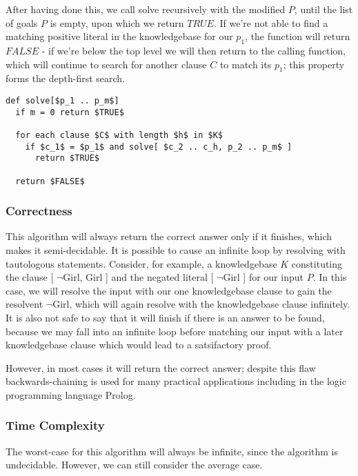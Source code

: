 \documentclass{article}
\begin{document}
After having done this, we call solve recursively with the modified $P$, until
the list of goals $P$ is empty, upon which we return $TRUE$. If we're not able
to find a matching positive literal in the knowledgebase for our $p_1$, the
function will return $FALSE$ - if we're below the top level we will then return
to the calling function, which will continue to search for another clause $C$ to
match its $p_1$; this property forms the depth-first search.

\begin{lstlisting}[mathescape=true]
def solve[$p_1 .. p_m$]
  if m = 0 return $TRUE$

  for each clause $C$ with length $h$ in $K$
    if $c_1$ = $p_1$ and solve[ $c_2 .. c_h, p_2 .. p_m$ ]
      return $TRUE$
  
  return $FALSE$
\end{lstlisting}

\subsubsection{Correctness}

This algorithm will always return the correct answer only if it finishes, which
makes it semi-decidable.\cite{krr} It is possible to cause an infinite loop by resolving
with tautologous statements. Consider, for example, a knowledgebase $K$ constituting
the clause [ $\neg$Girl, Girl ] and the negated literal [ $\neg$Girl ] for our
input $P$. In this case, we will resolve the input with our one knowledgebase 
clause to gain the resolvent $\neg$Girl, which will again resolve with the
knowledgebase clause infinitely. It is also not safe to say
that it will finish if there is an answer to be found, because we may fall into
an infinite loop before matching our input with a later knowledgebase clause
which would lead to a satsifactory proof.

However, in most cases it will return the correct answer; despite this flaw
backwards-chaining is used for many practical applications including in the
logic programming language Prolog.\cite{prolog}

\subsubsection{Time Complexity}

The worst-case for this algorithm will always be infinite, since the algorithm
is undecidable. However, we can still consider the average case.
\end{document}
